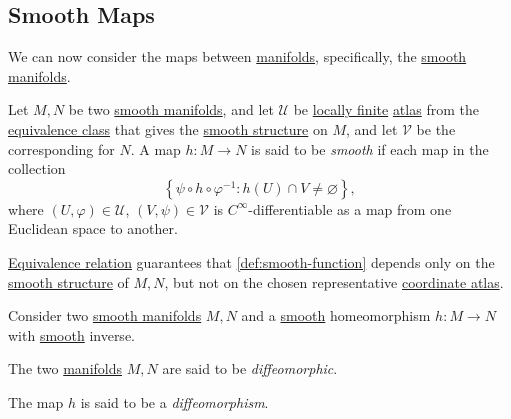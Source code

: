 \subsection{Smooth Maps}
We can now consider the maps between \hyperref[def:topological-manifold]{manifolds}, specifically, the \hyperref[def:smooth-manifold]{smooth manifolds}.

\begin{definition}\label{def:smooth-function}
	Let \(M, N\) be two \hyperref[def:smooth-manifold]{smooth manifolds}, and let \(\mathcal{U}\) be \hyperref[def:locally-finite]{locally finite} \hyperref[def:atlas]{atlas} from the \hyperref[def:equivalence-atlas]{equivalence class} that gives the \hyperref[def:smooth-structure]{smooth structure} on \(M\), and let \(\mathcal{V}\) be the corresponding for \(N\). A map \(h\colon M \to N\) is said to be \emph{smooth} if each map in the collection
	\[
		\left\{ \psi \circ h\circ \varphi ^{-1} \colon h(U) \cap V \neq \varnothing \right\},
	\]
	where \((U, \varphi )\in \mathcal{U} \), \((V, \psi )\in \mathcal{V} \) is \(C^{\infty} \)-differentiable as a map from one Euclidean space to another.
\end{definition}

\begin{center}
\end{center}

\begin{remark}
	\hyperref[def:equivalence-atlas]{Equivalence relation} guarantees that \autoref{def:smooth-function} depends only on the \hyperref[def:smooth-structure]{smooth structure} of \(M, N\), but not on the chosen representative \hyperref[def:atlas]{coordinate atlas}.
\end{remark}

\begin{definition*}
	Consider two \hyperref[def:smooth-manifold]{smooth manifolds} \(M, N\) and a \hyperref[def:smooth-function]{smooth} homeomorphism \(h\colon M \to N\) with \hyperref[def:smooth-function]{smooth} inverse.
	\begin{definition}[Diffeomorphic]\label{def:diffeomorphic}
		The two \hyperref[def:smooth-manifold]{manifolds} \(M, N\) are said to be \emph{diffeomorphic}.
	\end{definition}
	\begin{definition}[Diffeomorphism]\label{def:diffeomorphism}
		The map \(h\) is said to be a \emph{diffeomorphism}.
	\end{definition}
\end{definition*}

